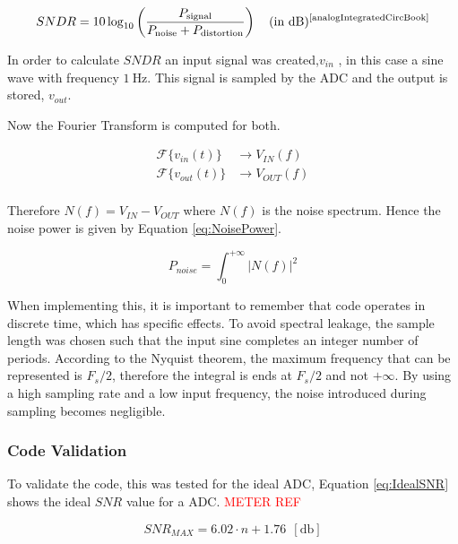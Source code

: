 \begin{equation}
    SNDR = 10 \log_{10} \left( \frac{P_{\text{signal}}}{P_{\text{noise}} + P_{\text{distortion}}} \right)  \quad \text{(in dB)} \textsuperscript{\cite{analogIntegratedCircBook}}
    \label{eq:SNDR}
\end{equation}

In order to calculate $SNDR$ an input signal was created,$v_{in}$ , in this case a sine wave with frequency $\SI{1}{\hertz}$. This signal is sampled by the ADC and the output is stored, $v_{out}$.

Now the Fourier Transform is computed for both.

\begin{equation}
    \begin{split}
        \mathcal{F}\{v_{in}(t)\} &\rightarrow V_{IN}(f)\\
        \mathcal{F}\{v_{out}(t)\} &\rightarrow V_{OUT}(f)\\
    \end{split}
    \label{eq:fourier}
\end{equation}

Therefore $N(f) = V_{IN} - V_{OUT}$ where $N(f)$ is the noise spectrum. Hence the noise power is given by Equation \ref{eq:NoisePower}.

\begin{equation}
    P_{noise} = \int_{0}^{+\infty}|N(f)|^2 
    \label{eq:NoisePower}
\end{equation}

When implementing this, it is important to remember that code operates in discrete time, which has specific effects.  To avoid spectral leakage, the sample length was chosen such that the input sine completes an integer number of periods. According to the Nyquist theorem, the maximum frequency that can be represented is $F_s/2$, therefore the integral is ends at $F_s/2$ and not $+\infty$. By using a high sampling rate and a low input frequency, the noise introduced during sampling becomes negligible.

\subsubsection{Code Validation}

To validate the code, this was tested for the ideal ADC, Equation \ref{eq:IdealSNR} shows the ideal $SNR$ value for a ADC. \textcolor{red}{METER REF}

\begin{equation}
    SNR_{MAX} = 6.02\cdot n+1.76~~[\si{\decibel}]
    \label{eq:IdealSNR}
\end{equation}

